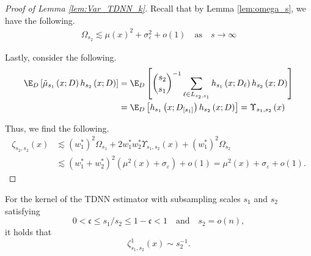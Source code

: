 \begin{proof}[Proof of Lemma \ref{lem:Var_TDNN_k}]
	Recall that by Lemma \ref{lem:omega_s}, we have the following.
	\begin{equation}
		\begin{aligned}
			\Omega_{s_2}
			\lesssim \mu(x)^2 + \sigma_{\varepsilon}^2 + o(1)
			\quad \text{as} \quad s \rightarrow \infty
		\end{aligned}
	\end{equation}

	Lastly, consider the following.
	\begin{equation}
		\begin{aligned}
			\E_{D}\left[\tilde{\mu}_{s_1}\left(x; D\right) h_{s_2}\left(x; D\right)\right]
			 & = \E_D\left[\binom{s_2}{s_1}^{-1}\sum_{\ell \in L_{s_2, s_1}} h_{s_1}\left(x; D_{\ell}\right)h_{s_2}\left(x; D\right)\right] \\
			 & = \E_D\left[h_{s_1}\left(x; D_{[s_1]}\right)h_{s_2}\left(x; D\right)\right]
			= \Upsilon_{s_1, s_2}\left(x\right)
		\end{aligned}
	\end{equation}

	Thus, we find the following.
	\begin{equation}
		\begin{aligned}
			\zeta_{s_2, s_2}\left(x\right)
			 & \lesssim \left(w_{1}^{*}\right)^2 \Omega_{s_1}
			+ 2 w_{1}^{*}w_{2}^{*} \Upsilon_{s_1, s_2}\left(x\right)
			+ \left(w_{1}^{*}\right)^2 \Omega_{s_2}                                                                       \\
			 & \lesssim \left(w_{1}^{*} + w_{2}^{*}\right)^2 \left(\mu^2(x) + \sigma_{\varepsilon}\right) + o(1)
			= \mu^2(x) + \sigma_{\varepsilon} + o(1).
		\end{aligned}
	\end{equation}
\end{proof}

\newpage

\begin{lem}\label{lem:dem10}
	For the kernel of the TDNN estimator with subsampling scales $s_1$ and $s_2$ satisfying
	\begin{equation}
		0 < \mathfrak{c} \leq s_1 / s_2 \leq 1 - \mathfrak{c} < 1
		\quad \text{and} \quad
		s_2 = o(n),
	\end{equation}
	it holds that
	\begin{equation}
		\zeta_{s_1, s_2}^{1}\left(x\right)
		\sim s_2^{-1}.
	\end{equation}
\end{lem}

